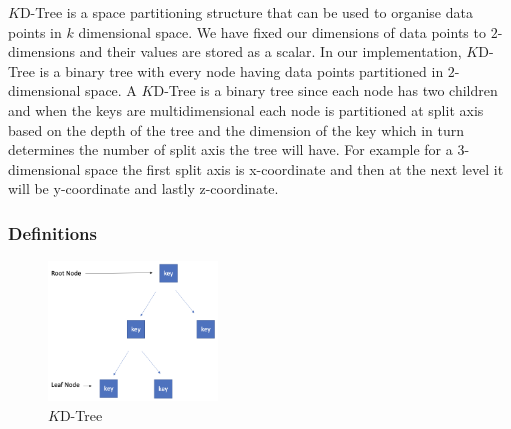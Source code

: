 $K$D-Tree is a space partitioning structure that can be used to organise data points in $k$ dimensional space. We have fixed our dimensions of data points to $2$-dimensions and their values are stored as a scalar. In our implementation, $K$D-Tree is a binary tree with every node having data points partitioned in $2$-dimensional space. A $K$D-Tree is a binary tree since each node has two children and when the keys are multidimensional each node is partitioned at split axis based on the depth of the tree and the dimension of the key which in turn determines the number of split axis the tree will have. For example for a $3$-dimensional space the first split axis is x-coordinate and then at the next level it will be y-coordinate and lastly z-coordinate. 

\subsubsection{Definitions}

\begin{figure}[htp]
    \centering
    \includegraphics[width=0.4\textwidth]{graphs/KD-Tree.png}
    \caption{$K$D-Tree}
    \label{fig:$K$D-Tree}
\end{figure}

